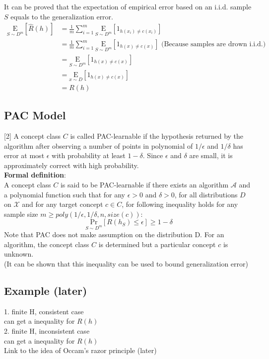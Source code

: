\documentclass[12pt]{article}
\theoremstyle{definition}
\theoremstyle{remark}
\numberwithin{equation}{section}
\begin{document}
It can be proved that the expectation of empirical error based on an i.i.d. sample $S$ equals to the generalization error.
\begin{align*}
 \underset{S \sim D^m}{\text{E}}[\widehat{R}(h)] &= \frac{1}{m}\sum_{i=1}^{m}\underset{S \sim D^m}{\text{E}}[1_{h(x_i) \neq c(x_i)}] \\
 &= \frac{1}{m}\sum_{i=1}^{m}\underset{S \sim D^m}{\text{E}}[1_{h(x) \neq c(x)}] \text{  (Because samples are drown i.i.d.)} \\
 &= \underset{S \sim D^m}{\text{E}}[1_{h(x) \neq c(x)}] \\
 &= \underset{x \sim D}{\text{E}}[1_{h(x) \neq c(x)}] \\
 &= R(h)
\end{align*}
\subsection{PAC Model}
[2] A concept class $C$ is called PAC-learnable if the hypothesis returned by the algorithm after observing a number of points in polynomial of $1/\epsilon$ and $1/\delta$ has error at most $\epsilon$ with probability at least $1-\delta$. Since $\epsilon$ and $\delta$ are small, it is approximately correct with high probability. \\[0.2cm]
\textbf{Formal definition}:\\[0.2cm]
A concept class $C$ is said to be PAC-learnable if there exists an algorithm $\mathcal{A}$ and a polynomial function such that for any $\epsilon > 0$ and $\delta > 0$, for all distributions $D$ on $\mathcal{X}$ and for any target concept $c \in C$, for following inequality holds for any sample size $ m \geq poly(1/\epsilon,1/\delta,n,size(c) )$:
\[\underset{S \sim D^m}{\text{Pr}}[R(h_S) \leq \epsilon ] \geq 1 - \delta \]
Note that PAC does not make assumption on the distribution D. For an algorithm, the concept class $C$ is determined but a particular concept $c$ is unknown. \\[0.2cm]
(It can be shown that this inequality can be used to bound generalization error)
\subsection{Example (later)}
1. finite H, consistent case \\[0.2cm]
can get a inequality for $R(h)$\\[0.2cm]
2. finite H, inconsistent case \\[0.2cm]
can get a inequality for $R(h)$ \\[0.2cm]
Link to the idea of Occam's razor principle (later)
\end{document}
